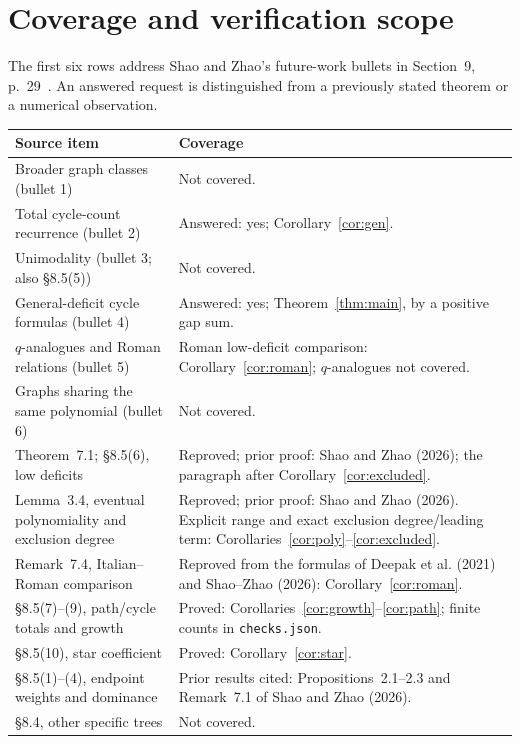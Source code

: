 \documentclass[11pt]{article}
\begin{document}
\section{Coverage and verification scope}
The first six rows address Shao and Zhao's future-work bullets in
Section~9, p.~29~\cite{SZ}. An answered request is distinguished from
a previously stated theorem or a numerical observation.
\begin{center}\small
\begin{tabular}{@{}p{.46\linewidth}p{.46\linewidth}@{}}
\toprule
Source item & Coverage \\
\midrule
Broader graph classes (bullet 1) & Not covered.\\
Total cycle-count recurrence (bullet 2) & Answered: yes;
Corollary~\ref{cor:gen}.\\
Unimodality (bullet 3; also \S8.5(5)) & Not covered.\\
General-deficit cycle formulas (bullet 4) & Answered: yes;
Theorem~\ref{thm:main}, by a positive gap sum.\\
$q$-analogues and Roman relations (bullet 5) & Roman low-deficit
comparison: Corollary~\ref{cor:roman}; $q$-analogues not covered.\\
Graphs sharing the same polynomial (bullet 6) & Not covered.\\
\midrule
Theorem~7.1; \S8.5(6), low deficits & Reproved; prior proof:
Shao and Zhao (2026); the paragraph after Corollary~\ref{cor:excluded}.\\
Lemma~3.4, eventual polynomiality and exclusion degree & Reproved;
prior proof: Shao and Zhao (2026). Explicit range and exact exclusion
degree/leading term: Corollaries~\ref{cor:poly}--\ref{cor:excluded}.\\
Remark~7.4, Italian--Roman comparison & Reproved from the formulas of
Deepak et al. (2021) and Shao--Zhao (2026): Corollary~\ref{cor:roman}.\\
\S8.5(7)--(9), path/cycle totals and growth & Proved:
Corollaries~\ref{cor:growth}--\ref{cor:path}; finite counts in \texttt{checks.json}.\\
\S8.5(10), star coefficient & Proved: Corollary~\ref{cor:star}.\\
\S8.5(1)--(4), endpoint weights and dominance & Prior results cited:
Propositions~2.1--2.3 and Remark~7.1 of Shao and Zhao (2026).\\
\S8.4, other specific trees & Not covered.\\
\bottomrule
\end{tabular}
\end{center}
\end{document}
